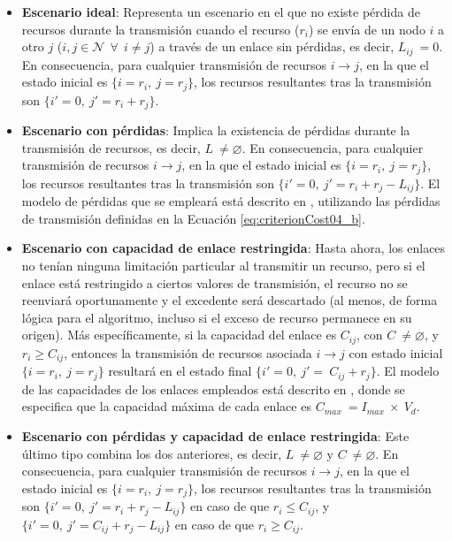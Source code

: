 \begin{itemize}

    \item \textbf{Escenario ideal}: Representa un escenario en el que no existe pérdida de recursos durante la transmisión cuando el recurso ($r_{i}$) se envía de un nodo $i$ a otro $j$ ($i,j \in \mathcal{N} \: \:\forall \:\: i \neq j$) a través de un enlace sin pérdidas, es decir, $L_{ij} \: = 0$. En consecuencia, para cualquier transmisión de recursos $i \rightarrow j$, en la que el estado inicial es $\{i=r_{i},\: j=r_{j}\}$, los recursos resultantes tras la transmisión son $\{i' = 0,\: j' = r_{i}+r_{j}\}$.
    
    
    \item \textbf{Escenario con pérdidas}: Implica la existencia de pérdidas durante la transmisión de recursos, es decir, $L \: \neq \varnothing$. En consecuencia, para cualquier transmisión de recursos $i \rightarrow j$, en la que el estado inicial es $\{i=r_{i},\: j=r_{j}\}$, los recursos resultantes tras la transmisión son $\{i' = 0,\: j' = r_{i}+r_{j}-L_{ij}\}$. El modelo de pérdidas que se empleará está descrito en \cite{Schneider17}, utilizando las pérdidas de transmisión definidas en la Ecuación \ref{eq:criterionCost04_b}.
    
    
    \item \textbf{Escenario con capacidad de enlace restringida}: Hasta ahora, los enlaces no tenían ninguna limitación particular al transmitir un recurso, pero si el enlace está restringido a ciertos valores de transmisión, el recurso no se reenviará oportunamente y el excedente será descartado (al menos, de forma lógica para el algoritmo, incluso si el exceso de recurso permanece en su origen). Más específicamente, si la capacidad del enlace es $C_{ij}$, con $C \: \neq \varnothing$, y $r_{i} \geq C_{ij}$, entonces la transmisión de recursos asociada $i \rightarrow j$ con estado inicial $\{i=r_{i},\: j=r_{j}\}$ resultará en el estado final $\{i' = 0,\: j' = \: C_{ij}+r_{j}\}$. El modelo de las capacidades de los enlaces empleados está descrito en \cite{Schneider17}, donde se especifica que la capacidad máxima de cada enlace es $C_{max} \: = I_{max} \: \times \: V_{d}$.
    
    
    \item \textbf{Escenario con pérdidas y capacidad de enlace restringida}: Este último tipo combina los dos anteriores, es decir, $L \: \neq \varnothing$ y $C \: \neq \varnothing$. En consecuencia, para cualquier transmisión de recursos $i \rightarrow j$, en la que el estado inicial es $\{i=r_{i},\: j=r_{j}\}$, los recursos resultantes tras la transmisión son $\{i' = 0,\: j' = r_{i}+r_{j}-L_{ij}\}$ en caso de que $r_{i} \leq C_{ij}$, y $\{i' = 0,\: j' = C_{ij}+r_{j}-L_{ij}\}$ en caso de que $r_{i} \geq C_{ij}$.  
 
\end{itemize}

